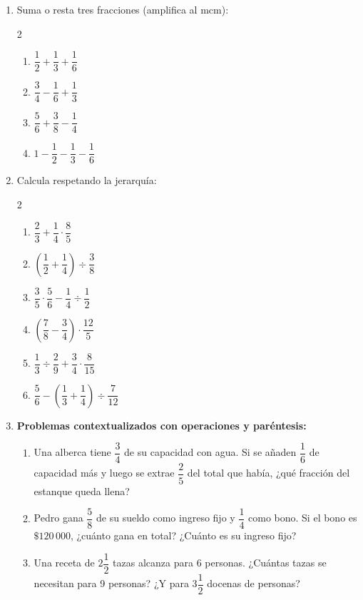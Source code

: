 \documentclass[11pt, letterpaper]{article}
\begin{document}
\begin{enumerate}[label=\textbf{\arabic*.}, leftmargin=*, resume]

\item Suma o resta tres fracciones (amplifica al mcm):
\begin{multicols}{2}
\begin{enumerate}[label=\alph*)]
  \item $\dfrac{1}{2}+\dfrac{1}{3}+\dfrac{1}{6}$
  \item $\dfrac{3}{4}-\dfrac{1}{6}+\dfrac{1}{3}$
  \item $\dfrac{5}{6}+\dfrac{3}{8}-\dfrac{1}{4}$
  \item $1-\dfrac{1}{2}-\dfrac{1}{3}-\dfrac{1}{6}$
\end{enumerate}
\end{multicols}

\item Calcula respetando la jerarqu\'ia:
\begin{multicols}{2}
\begin{enumerate}[label=\alph*)]
  \item $\dfrac{2}{3}+\dfrac{1}{4}\cdot\dfrac{8}{5}$
  \item $\left(\dfrac{1}{2}+\dfrac{1}{4}\right)\div\dfrac{3}{8}$
  \item $\dfrac{3}{5}\cdot\dfrac{5}{6}-\dfrac{1}{4}\div\dfrac{1}{2}$
  \item $\left(\dfrac{7}{8}-\dfrac{3}{4}\right)\cdot\dfrac{12}{5}$
  \item $\dfrac{1}{3}\div\dfrac{2}{9}+\dfrac{3}{4}\cdot\dfrac{8}{15}$
  \item $\dfrac{5}{6}-\left(\dfrac{1}{3}+\dfrac{1}{4}\right)\div\dfrac{7}{12}$
\end{enumerate}
\end{multicols}

\item \textbf{Problemas contextualizados con operaciones y par\'entesis:}
\begin{enumerate}[label=\alph*)]
  \item Una alber\-ca tiene $\dfrac{3}{4}$ de su capacidad con agua. Si se a\~naden $\dfrac{1}{6}$ de capacidad m\'as y luego se extrae $\dfrac{2}{5}$ del total que hab\'ia, ¿qu\'e fracci\'on del estanque queda llena?
  \item Pedro gana $\dfrac{5}{8}$ de su sueldo como ingreso fijo y $\dfrac{1}{4}$ como bono. Si el bono es $\$120\,000$, ¿cu\'anto gana en total? ¿Cu\'anto es su ingreso fijo?
  \item Una receta de $2\dfrac{1}{2}$ tazas alcanza para 6 personas. ¿Cu\'antas tazas se necesitan para 9 personas? ¿Y para $3\dfrac{1}{2}$ docenas de personas?
\end{enumerate}

\end{enumerate}
\end{document}
